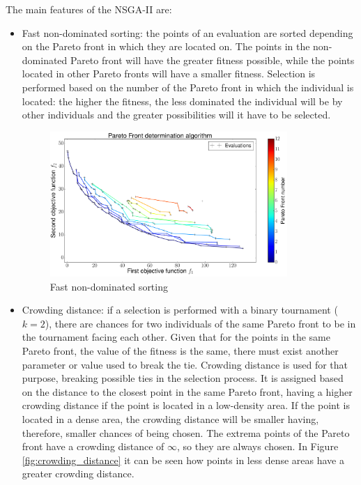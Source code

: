\newpage
The main features of the NSGA-II are:
\begin{itemize}
    \item Fast non-dominated sorting: the points of an evaluation are sorted depending on the Pareto front in which they are located on. The points in the non-dominated Pareto front will have the greater fitness possible, while the points located in other Pareto fronts will have a smaller fitness. Selection is performed based on the number of the Pareto front in which the individual is located: the higher the fitness, the less dominated the individual will be by other individuals and the greater possibilities will it have to be selected.
    \begin{figure}[h!]
        \centering
        \includegraphics[width=0.85\textwidth]{Figures/2/fastNonDominatedSort.pdf}
        \caption{Fast non-dominated sorting}
        \label{fig:fast-nondominated-sorting}
    \end{figure}
    \item Crowding distance: if a selection is performed with a binary tournament ($k=2$), there are chances for two individuals of the same Pareto front to be in the tournament facing each other. Given that for the points in the same Pareto front, the value of the fitness is the same, there must exist another parameter or value used to break the tie. Crowding distance is used for that purpose, breaking possible ties in the selection process. It is assigned based on the distance to the closest point in the same Pareto front, having a higher crowding distance if the point is located in a low-density area. If the point is located in a dense area, the crowding distance will be smaller having, therefore, smaller chances of being chosen. The extrema points of the Pareto front have a crowding distance of $\infty$, so they are always chosen. In Figure \ref{fig:crowding_distance} it can be seen how points in less dense areas have a greater crowding distance.

\end{itemize}
